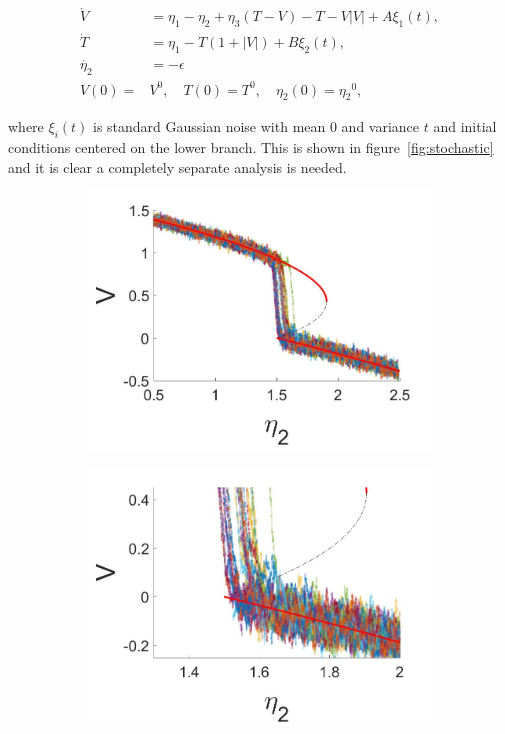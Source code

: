 \begin{equation}\label{eq:stochastic}
\begin{aligned}
\dot{V} & = \eta_1-\eta_2+\eta_3(T-V)-T-V|V|+A\xi_1(t), \\
  \dot{T}   & = \eta_1-T(1+|V|)+B\xi_2(t), \\
 \dot{\eta_2} & = -\epsilon\\
 V(0)=&V^0,\quad T(0)=T^0, \quad \eta_2(0)={\eta_2}^0,
\end{aligned}
\end{equation}

where $\xi_i(t)$ is standard Gaussian noise with mean 0 and variance $t$ and initial conditions centered on the lower branch. This is shown in figure~\ref{fig:stochastic} and it is clear a completely separate analysis is needed.

\begin{figure}[H]
\centering
\begin{subfigure}{.5\textwidth}
 \centering
 \includegraphics[width=\linewidth]{conclusion/stochastic_V.jpg}
 \caption{}
\end{subfigure}%
\begin{subfigure}{.5\textwidth}
 \centering
 \includegraphics[width=\linewidth]{conclusion/stochastic_V_zoom.jpg}

\end{subfigure}
\end{figure}
